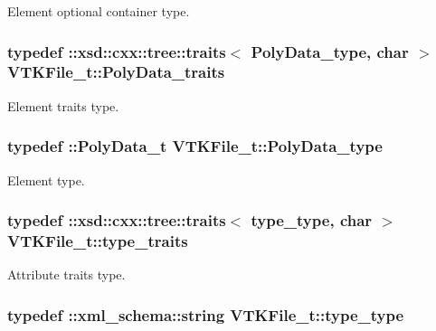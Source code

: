 Element optional container type. 

\hypertarget{classVTKFile__t_aa5ad98f5709c1e9beec3804a7f42b5f6}{
\subsubsection[{Poly\+Data\+\_\+traits}]{\setlength{\rightskip}{0pt plus 5cm}typedef \+::xsd\+::cxx\+::tree\+::traits$<$ {\bf Poly\+Data\+\_\+type}, char $>$ {\bf V\+T\+K\+File\+\_\+t\+::\+Poly\+Data\+\_\+traits}}}\label{classVTKFile__t_aa5ad98f5709c1e9beec3804a7f42b5f6}


Element traits type. 

\hypertarget{classVTKFile__t_a4588b4f0e28ba09aa219bda7e1fc6c97}{
\subsubsection[{Poly\+Data\+\_\+type}]{\setlength{\rightskip}{0pt plus 5cm}typedef \+::{\bf Poly\+Data\+\_\+t} {\bf V\+T\+K\+File\+\_\+t\+::\+Poly\+Data\+\_\+type}}}\label{classVTKFile__t_a4588b4f0e28ba09aa219bda7e1fc6c97}


Element type. 

\hypertarget{classVTKFile__t_aee4ac167e843e9def1be4f43ad930391}{
\subsubsection[{type\+\_\+traits}]{\setlength{\rightskip}{0pt plus 5cm}typedef \+::xsd\+::cxx\+::tree\+::traits$<$ {\bf type\+\_\+type}, char $>$ {\bf V\+T\+K\+File\+\_\+t\+::type\+\_\+traits}}}\label{classVTKFile__t_aee4ac167e843e9def1be4f43ad930391}


Attribute traits type. 

\hypertarget{classVTKFile__t_ac1f3484e4fde414849ede43a00955f76}{
\subsubsection[{type\+\_\+type}]{\setlength{\rightskip}{0pt plus 5cm}typedef \+::{\bf xml\+\_\+schema\+::string} {\bf V\+T\+K\+File\+\_\+t\+::type\+\_\+type}}}\label{classVTKFile__t_ac1f3484e4fde414849ede43a00955f76}


